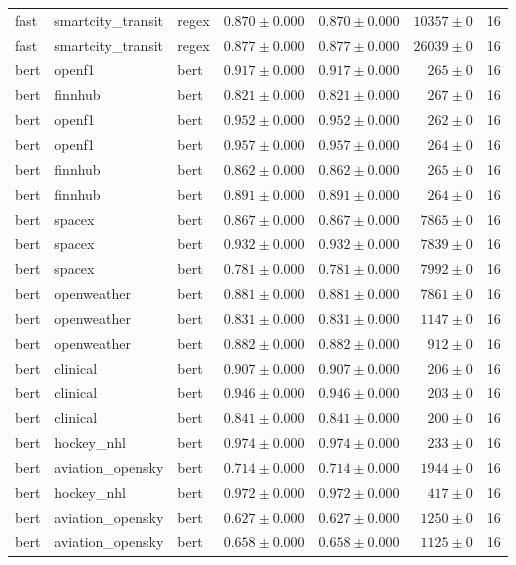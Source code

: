 \begin{table}[htbp]
\begin{tabular}{l l l r r r r}
fast & smartcity\_transit & regex & $0.870\pm0.000$ & $0.870\pm0.000$ & $10357\pm0$ & 16 \\
fast & smartcity\_transit & regex & $0.877\pm0.000$ & $0.877\pm0.000$ & $26039\pm0$ & 16 \\
bert & openf1 & bert & $0.917\pm0.000$ & $0.917\pm0.000$ & $265\pm0$ & 16 \\
bert & finnhub & bert & $0.821\pm0.000$ & $0.821\pm0.000$ & $267\pm0$ & 16 \\
bert & openf1 & bert & $0.952\pm0.000$ & $0.952\pm0.000$ & $262\pm0$ & 16 \\
bert & openf1 & bert & $0.957\pm0.000$ & $0.957\pm0.000$ & $264\pm0$ & 16 \\
bert & finnhub & bert & $0.862\pm0.000$ & $0.862\pm0.000$ & $265\pm0$ & 16 \\
bert & finnhub & bert & $0.891\pm0.000$ & $0.891\pm0.000$ & $264\pm0$ & 16 \\
bert & spacex & bert & $0.867\pm0.000$ & $0.867\pm0.000$ & $7865\pm0$ & 16 \\
bert & spacex & bert & $0.932\pm0.000$ & $0.932\pm0.000$ & $7839\pm0$ & 16 \\
bert & spacex & bert & $0.781\pm0.000$ & $0.781\pm0.000$ & $7992\pm0$ & 16 \\
bert & openweather & bert & $0.881\pm0.000$ & $0.881\pm0.000$ & $7861\pm0$ & 16 \\
bert & openweather & bert & $0.831\pm0.000$ & $0.831\pm0.000$ & $1147\pm0$ & 16 \\
bert & openweather & bert & $0.882\pm0.000$ & $0.882\pm0.000$ & $912\pm0$ & 16 \\
bert & clinical & bert & $0.907\pm0.000$ & $0.907\pm0.000$ & $206\pm0$ & 16 \\
bert & clinical & bert & $0.946\pm0.000$ & $0.946\pm0.000$ & $203\pm0$ & 16 \\
bert & clinical & bert & $0.841\pm0.000$ & $0.841\pm0.000$ & $200\pm0$ & 16 \\
bert & hockey\_nhl & bert & $0.974\pm0.000$ & $0.974\pm0.000$ & $233\pm0$ & 16 \\
bert & aviation\_opensky & bert & $0.714\pm0.000$ & $0.714\pm0.000$ & $1944\pm0$ & 16 \\
bert & hockey\_nhl & bert & $0.972\pm0.000$ & $0.972\pm0.000$ & $417\pm0$ & 16 \\
bert & aviation\_opensky & bert & $0.627\pm0.000$ & $0.627\pm0.000$ & $1250\pm0$ & 16 \\
bert & aviation\_opensky & bert & $0.658\pm0.000$ & $0.658\pm0.000$ & $1125\pm0$ & 16 \\

\end{tabular}
\end{table}
